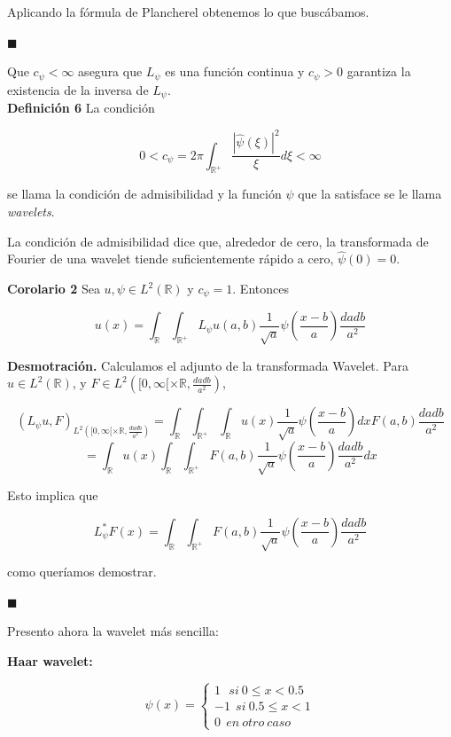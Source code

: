 \begin{itemize}
Aplicando la fórmula de Plancherel obtenemos lo que buscábamos.

\hfill$\blacksquare$

Que $c_\psi < \infty$ asegura que $L_\psi$ es una función continua y $c_\psi > 0$ garantiza la existencia de la inversa de $L_\psi$. \\

\textbf{Definición 6} La condición

$$0 < c_\psi = 2\pi \int_{\mathbb{R}^+} \frac{|\hat{\psi}(\xi)|^2}{\xi} d\xi < \infty$$

se llama la condición de admisibilidad y la función $\psi$ que la satisface se le llama \textit{wavelets}.

La condición de admisibilidad dice que, alrededor de cero, la transformada de Fourier de una wavelet tiende suficientemente rápido a cero, $\hat{\psi}(0) = 0$.

\textbf{Corolario 2} Sea $u, \psi \in L^2(\mathbb{R})$ y $c_\psi = 1$. Entonces

$$u(x) = \int_{\mathbb{R}} \int_{\mathbb{R}^+} L_\psi u(a,b) \frac{1}{\sqrt{a}} \psi\left(\frac{x-b}{a}\right) \frac{da db}{a^2}$$

\textbf{Desmotración.} Calculamos el adjunto de la transformada Wavelet. Para $u \in L^2(\mathbb{R})$, y $F \in L^2 \left( [0,\infty[ \times \mathbb{R}, \frac{da db}{a^2}\right)$,

$$(L_\psi u, F)_{L^2 \left( [0,\infty[ \times \mathbb{R}, \frac{da db}{a^2}\right)} = \int_{\mathbb{R}} \int_{\mathbb{R}^+} \int_{\mathbb{R}} u(x) \frac{1}{\sqrt{a}} \psi\left(\frac{x-b}{a}\right)dx F(a,b) \frac{da db}{a^2}$$
$$ = \int_{\mathbb{R}} u(x) \int_{\mathbb{R}} \int_{\mathbb{R}^+} F(a,b) \frac{1}{\sqrt{a}} \psi\left(\frac{x-b}{a}\right) \frac{da db}{a^2}dx $$

Esto implica que

$$L_\psi^* F(x) = \int_{\mathbb{R}} \int_{\mathbb{R}^+} F(a,b) \frac{1}{\sqrt{a}} \psi\left(\frac{x-b}{a}\right) \frac{da db}{a^2}$$

como queríamos demostrar.

\hfill$\blacksquare$

Presento ahora la wavelet más sencilla:

\textbf{Haar wavelet:} 

$$\psi(x) = \begin{cases}
	1 \  \ \ si \ 0 \leq x < 0.5 \\
	-1 \ \  si \ 0.5 \leq x < 1 \\
	0 \ \ en \ otro \ caso
\end{cases}$$


\end{itemize}
